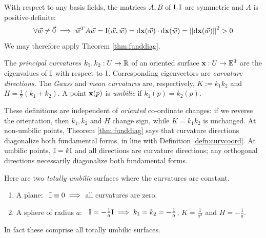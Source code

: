 

{}

With respect to any basis fields, the matrices $A,B$ of $\mathrm{I},\mathbb{I}$ are symmetric and $A$ is positive-definite:
\[\forall \vec w\neq\vec 0\implies \vec w^TA\vec w=\mathrm{I}(\vec w,\vec w)=\mathrm{d}{\mathbf{x}}(\vec w)\cdot\mathrm{d}{\mathbf{x}}(\vec w)=\left| \left| \mathrm{d}{\mathbf{x}}(\vec w)\right|\right|^2>0\]
We may therefore apply Theorem \ref{thm:funddiag}.

\begin{defn}{}{}
The \emph{principal curvatures} $k_1,k_2:U\to\mathbb{R}$ of an oriented surface ${\mathbf{x}}:U\to\mathbb{E}^3$ are the eigenvalues of $\mathbb{I}$ with respect to $\mathrm{I}$. Corresponding eigenvectors
are \emph{curvature directions.}\smallbreak
The \emph{Gauss} and \emph{mean curvatures} are, respectively, $K:=k_1k_2$ and $H=\frac 12(k_1+k_2)$.\smallbreak
A point ${\mathbf{x}}(p)$ is \emph{umbilic} if $k_1(p)=k_2(p)$.
\end{defn}


These definitions are independent of \emph{oriented} co-ordinate changes: if we reverse the orientation, then $k_1,k_2$ and $H$ change sign, while $K=k_1k_2$ is unchanged.\smallbreak
At non-umbilic points, Theorem \ref{thm:funddiag} says that curvature directions diagonalize both fundamental forms, in line with Definition \ref{defn:curvcoord}.\smallbreak
At umbilic points, $\mathbb{I}=k\mathrm{I}$ and all directions are curvature directions; any orthogonal directions necessarily diagonalize both fundamental forms. 



\begin{examples}{}{}
Here are two \emph{totally umbilic} surfaces where the curvatures are constant.
\begin{enumerate}\itemsep2pt
  \item A plane: \ $\mathbb{I}\equiv 0\implies$ all curvatures are zero.
  \item A sphere of radius $a$: \ $\mathbb{I}=-\frac 1a\mathrm{I}\implies k_1=k_2= -\frac 1a$, $K=\frac 1{a^2}$ and $H=-\frac 1{a}$.
\end{enumerate}
In fact these comprise all totally umbilic surfaces.
\end{examples}


